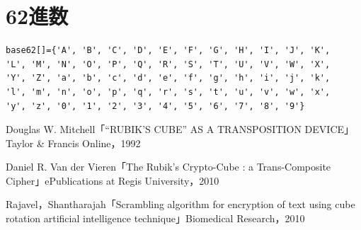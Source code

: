 \documentclass[a4j,titlepage]{jsarticle}
\begin{document}
\section{62進数}
\begin{verbatim}
base62[]={'A', 'B', 'C', 'D', 'E', 'F', 'G', 'H', 'I', 'J', 'K', 
'L', 'M', 'N', 'O', 'P', 'Q', 'R', 'S', 'T', 'U', 'V', 'W', 'X', 
'Y', 'Z', 'a', 'b', 'c', 'd', 'e', 'f', 'g', 'h', 'i', 'j', 'k', 
'l', 'm', 'n', 'o', 'p', 'q', 'r', 's', 't', 'u', 'v', 'w', 'x', 
'y', 'z', '0', '1', '2', '3', '4', '5', '6', '7', '8', '9'}
\end{verbatim}

\begin{thebibliography}{9}

 Douglas W. Mitchell「``RUBIK'S CUBE'' AS A TRANSPOSITION DEVICE」Taylor \& Francis Online，1992

 Daniel R. Van der Vieren「The Rubik's Crypto-Cube : a Trans-Composite Cipher」ePublications at Regis University，2010

 Rajavel，Shantharajah「Scrambling algorithm for encryption of text using cube rotation artificial intelligence technique」Biomedical Research，2010

\end{thebibliography}
\end{document}
